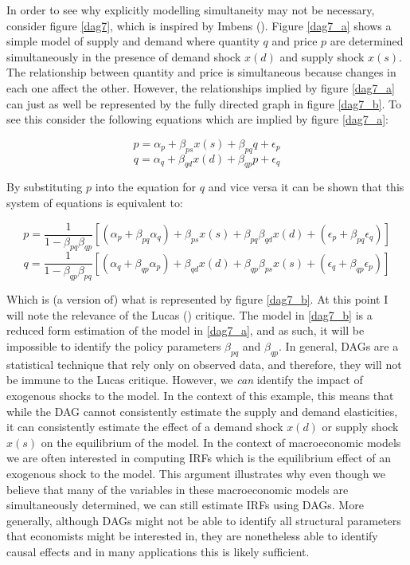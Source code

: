 \documentclass{article}
\begin{document}
In order to see why explicitly modelling simultaneity may not be necessary, consider figure \ref{dag7}, which is inspired by Imbens (\citeyear{imbens2019potential}). Figure \ref{dag7_a} shows a simple model of supply and demand where quantity $q$ and price $p$ are determined simultaneously in the presence of demand shock $x(d)$ and supply shock $x(s)$. The relationship between quantity and price is simultaneous because changes in each one affect the other. However, the relationships implied by figure \ref{dag7_a} can just as well be represented by the fully directed graph in figure \ref{dag7_b}. To see this consider the following equations which are implied by figure \ref{dag7_a}:

\begin{equation}
  p = \alpha_p + \beta_{ps} x(s) + \beta_{pq} q + \epsilon_{p}
\end{equation}
\begin{equation}
  q = \alpha_q + \beta_{qd} x(d) + \beta_{qp} p + \epsilon_{q}
\end{equation}

By substituting $p$ into the equation for $q$ and vice versa it can be shown that this system of equations is equivalent to:

\begin{equation}
  \label{price_eq}
  p = \frac{1}{1-\beta_{pq}\beta_{qp}}[(\alpha_p + \beta_{pq} \alpha_q) + \beta_{ps} x(s) + \beta_{pq} \beta_{qd} x(d) + (\epsilon_p + \beta_{pq} \epsilon_q)]
\end{equation}
\begin{equation}
  \label{quantity_eq}
  q = \frac{1}{1-\beta_{qp}\beta_{pq}}[(\alpha_q + \beta_{qp} \alpha_p) + \beta_{qd} x(d) + \beta_{qp} \beta_{ps} x(s) + (\epsilon_q + \beta_{qp} \epsilon_p)]
\end{equation}

Which is (a version of) what is represented by figure \ref{dag7_b}. At this point I will note the relevance of the Lucas (\citeyear{lucas1976econometric}) critique. The model in \ref{dag7_b} is a reduced form estimation of the model in \ref{dag7_a}, and as such, it will be impossible to identify the policy parameters $\beta_{pq}$ and $\beta_{qp}$. In general, DAGs are a statistical technique that rely only on observed data, and therefore, they will not be immune to the Lucas critique. However, we \textit{can} identify the impact of exogenous shocks to the model. In the context of this example, this means that while the DAG cannot consistently estimate the supply and demand elasticities, it can consistently estimate the effect of a demand shock $x(d)$ or supply shock $x(s)$ on the equilibrium of the model. In the context of macroeconomic models we are often interested in computing IRFs which is the equilibrium effect of an exogenous shock to the model. This argument illustrates why even though we believe that many of the variables in these macroeconomic models are simultaneously determined, we can still estimate IRFs using DAGs. More generally, although DAGs might not be able to identify all structural parameters that economists might be interested in, they are nonetheless able to identify causal effects and in many applications this is likely sufficient. 
\end{document}
